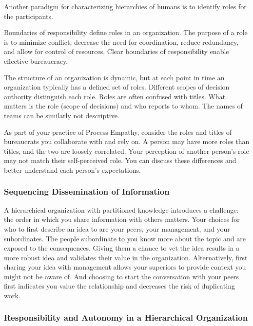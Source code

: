 Another paradigm for characterizing hierarchies of humans is to identify roles for the participants. 

Boundaries of responsibility define roles in an organization. The purpose of a role is to minimize conflict, decrease the need for coordination, reduce redundancy, and allow for control of resources. Clear boundaries of responsibility  enable effective bureaucracy. 

The structure of an organization is dynamic, but at each point in time an organization typically has a defined set of roles. Different scopes of decision authority distinguish each role. 
Roles are often confused with titles. What matters is the role (scope of decisions) and who reports to whom. The names of teams can be similarly not descriptive.

As part of your practice of Process Empathy, consider the roles and titles of bureaucrats you collaborate with and rely on. A person may have more roles than titles, and the two are loosely correlated. Your perception of another person's role may not match their self-perceived role. You can discuss these differences and better understand each person's expectations. 


\subsubsection*{Sequencing Dissemination of Information}

A hierarchical organization with partitioned knowledge introduces a challenge: the order in which you share information with others matters. Your choices for who to first describe an idea to are your peers, your management, and your subordinates. 
The people subordinate to you know more about the topic and are exposed to the consequences. Giving them a chance to vet the idea results in a more robust idea and validates their value in the organization. Alternatively, first sharing your idea with management  allows your superiors to provide context you might not be aware of. And choosing to  start the conversation with your peers first indicates you value the relationship and decreases the risk of duplicating work.


\subsubsection*{Responsibility and Autonomy in a Hierarchical Organization}

